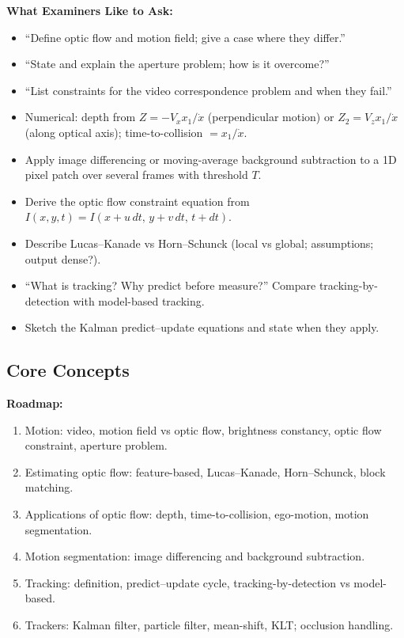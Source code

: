 \separator

\textbf{What Examiners Like to Ask:}
\begin{itemize}
  \item ``Define optic flow and motion field; give a case where they differ.''
  \item ``State and explain the aperture problem; how is it overcome?''
  \item ``List constraints for the video correspondence problem and when they fail.''
  \item Numerical: depth from $Z = -V_x x_1 / \dot{x}$ (perpendicular motion) or $Z_2 = V_z x_1 / \dot{x}$ (along optical axis); time-to-collision $= x_1 / \dot{x}$.
  \item Apply image differencing or moving-average background subtraction to a 1D pixel patch over several frames with threshold $T$.
  \item Derive the optic flow constraint equation from $I(x,y,t) = I(x+u\,dt,\,y+v\,dt,\,t+dt)$.
  \item Describe Lucas--Kanade vs Horn--Schunck (local vs global; assumptions; output dense?).
  \item ``What is tracking? Why predict before measure?'' Compare tracking-by-detection with model-based tracking.
  \item Sketch the Kalman predict--update equations and state when they apply.
\end{itemize}

\subsection{Core Concepts}

\textbf{Roadmap:}
\begin{enumerate}
  \item Motion: video, motion field vs optic flow, brightness constancy, optic flow constraint, aperture problem.
  \item Estimating optic flow: feature-based, Lucas--Kanade, Horn--Schunck, block matching.
  \item Applications of optic flow: depth, time-to-collision, ego-motion, motion segmentation.
  \item Motion segmentation: image differencing and background subtraction.
  \item Tracking: definition, predict--update cycle, tracking-by-detection vs model-based.
  \item Trackers: Kalman filter, particle filter, mean-shift, KLT; occlusion handling.
\end{enumerate}

